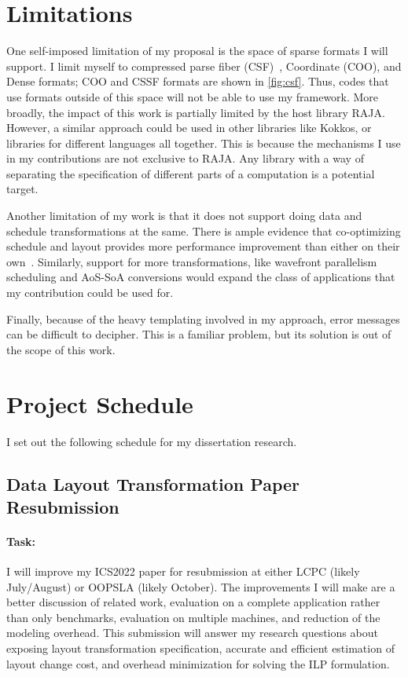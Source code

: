 \documentclass{article}
\begin{document}
\section{Limitations}
\label{Sec:Limitations}
One self-imposed limitation of my proposal is the space of sparse formats I will support.
I limit myself to compressed parse fiber (CSF)~\cite{smith2015tensor}, Coordinate (COO), and Dense formats; 
COO and CSSF formats are shown in \autoref{fig:csf}.
Thus, codes that use formats outside of this space will not be able to use my framework.
More broadly, the impact of this work is partially limited by the host library RAJA. 
However, a similar approach could be used in other libraries like Kokkos, or libraries for different languages all together.
This is because the mechanisms I use in my contributions are not exclusive to RAJA. 
Any library with a way of separating the specification of different parts of a computation is a potential target.

Another limitation of my work is that it does not support doing data and schedule transformations at the same. 
There is ample evidence that co-optimizing schedule and layout provides more performance improvement than either on their own~\cite{shirako2019integrating}.
Similarly, support for more transformations, like wavefront parallelism scheduling and AoS-SoA conversions would expand the class of applications that my contribution could be used for.

Finally, because of the heavy templating involved in my approach, error messages can be difficult to decipher. 
This is a familiar problem, but its solution is out of the scope of this work.


\section{Project Schedule}
\label{Sec:Schedule}
I set out the following schedule for my dissertation research.

\subsection{Data Layout Transformation Paper Resubmission}

\paragraph{Task:} I will improve my ICS2022 paper for resubmission at either LCPC (likely July/August) or OOPSLA (likely October). 
The improvements I will make are a better discussion of related work, evaluation on a complete application rather than only benchmarks, evaluation on multiple machines, and reduction of the modeling overhead.
This submission will answer my research questions about exposing layout transformation specification, accurate and efficient estimation of layout change cost, and overhead minimization for solving the ILP formulation.
\end{document}
